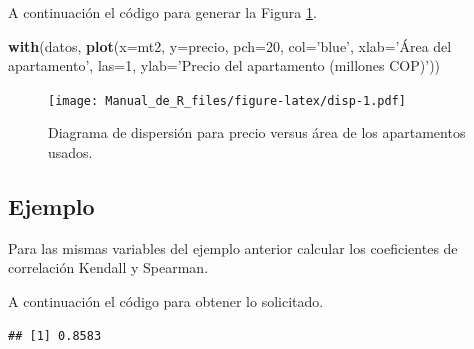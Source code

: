 \documentclass[10pt,]{krantz}
\makeatletter
\newenvironment{Shaded}{\begin{snugshade}}{\end{snugshade}}
\newcommand{\KeywordTok}[1]{\textcolor[rgb]{0.13,0.29,0.53}{\textbf{#1}}}
\newcommand{\DataTypeTok}[1]{\textcolor[rgb]{0.13,0.29,0.53}{#1}}
\newcommand{\DecValTok}[1]{\textcolor[rgb]{0.00,0.00,0.81}{#1}}
\newcommand{\StringTok}[1]{\textcolor[rgb]{0.31,0.60,0.02}{#1}}
\newcommand{\OperatorTok}[1]{\textcolor[rgb]{0.81,0.36,0.00}{\textbf{#1}}}
\newcommand{\NormalTok}[1]{#1}
\newenvironment{kframe}{%
\medskip{}
\setlength{\fboxsep}{.8em}
 \def\at@end@of@kframe{}%
 \ifinner\ifhmode%
  \def\at@end@of@kframe{\end{minipage}}%
  \begin{minipage}{\columnwidth}%
 \fi\fi%
 \def\FrameCommand##1{\hskip\@totalleftmargin \hskip-\fboxsep
 \colorbox{shadecolor}{##1}\hskip-\fboxsep
     \hskip-\linewidth \hskip-\@totalleftmargin \hskip\columnwidth}%
 \MakeFramed {\advance\hsize-\width
   \@totalleftmargin\z@ \linewidth\hsize
   \@setminipage}}%
 {\par\unskip\endMakeFramed%
 \at@end@of@kframe}
\renewenvironment{Shaded}{\begin{kframe}}{\end{kframe}}
\makeatother
\begin{document}
A continuación el código para generar la Figura \ref{fig:disp}.

\begin{Shaded}
\begin{Highlighting}[]
\KeywordTok{with}\NormalTok{(datos, }\KeywordTok{plot}\NormalTok{(}\DataTypeTok{x=}\NormalTok{mt2, }\DataTypeTok{y=}\NormalTok{precio, }\DataTypeTok{pch=}\DecValTok{20}\NormalTok{, }\DataTypeTok{col=}\StringTok{'blue'}\NormalTok{,}
                 \DataTypeTok{xlab=}\StringTok{'Área del apartamento'}\NormalTok{, }\DataTypeTok{las=}\DecValTok{1}\NormalTok{,}
                 \DataTypeTok{ylab=}\StringTok{'Precio del apartamento (millones COP)'}\NormalTok{))}
\end{Highlighting}
\end{Shaded}

\begin{figure}
\centering
\texttt{[image: Manual\_de\_R\_files/figure-latex/disp-1.pdf]}
\caption{\label{fig:disp}Diagrama de dispersión para precio versus área de
los apartamentos usados.}
\end{figure}

\subsection*{Ejemplo}\label{ejemplo-44}


Para las mismas variables del ejemplo anterior calcular los coeficientes
de correlación Kendall y Spearman.

A continuación el código para obtener lo solicitado.

\begin{Shaded}
\end{Shaded}

\begin{verbatim}
## [1] 0.8583
\end{verbatim}

\begin{Shaded}
\end{Shaded}
\end{document}
